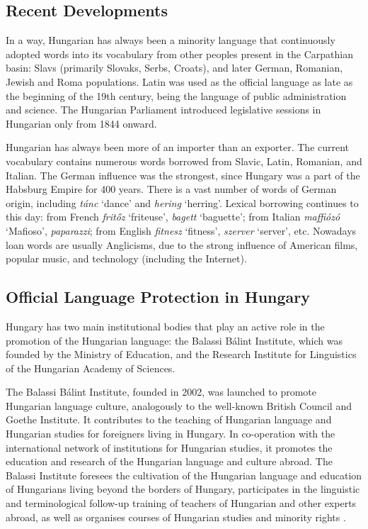 \begin{multicols}{2}
  \subsection{Recent Developments}

  In a way, Hungarian has always been a minority language that continuously adopted words into its vocabulary from other peoples present in the Carpathian basin: Slavs (primarily Slovaks, Serbs, Croats), and later German, Romanian, Jewish and Roma populations. Latin was used as the official language as late as the beginning of the 19th century, being the language of public administration and science. The Hungarian Parliament introduced legislative sessions in Hungarian only from 1844 onward.

  Hungarian has always been more of an importer than an exporter. The current vocabulary contains numerous words borrowed from Slavic, Latin, Romanian, and Italian. The German influence was the strongest, since Hungary was a part of the Habsburg Empire for 400 years. There is a vast number of words of German origin, including \textit{tánc} `dance' and \textit{hering} `herring'. Lexical borrowing continues to this day: from French \textit{fritőz} `friteuse', \textit{bagett} `baguette'; from Italian \textit{maffiózó} `Mafioso', \textit{paparazzi}; from English \textit{fitnesz} `fitness', \textit{szerver} `server', etc. Nowadays loan words are usually Anglicisms, due to the strong influence of American films, popular music, and technology (including the Internet). 

  \subsection{Official Language Protection in Hungary}

  Hungary has two main institutional bodies that play an active role in the promotion of the Hungarian language: the Balassi Bálint Institute, which was founded by the Ministry of Education, and  the Research Institute for Linguistics of the Hungarian Academy of Sciences. 


  The Balassi Bálint Institute, founded in 2002, was launched to promote Hungarian language culture, analogously to the well-known British Council and Goethe Institute. It contributes to the teaching of Hungarian language and Hungarian studies for foreigners living in Hungary. In co-operation with the international network of institutions for Hungarian studies, it promotes the education and research of the Hungarian language and culture abroad.  The Balassi Institute foresees the cultivation of the Hungarian language and education of Hungarians living beyond the borders of Hungary, participates in the linguistic and terminological follow-up training of teachers of Hungarian and other experts abroad, as well as organises courses of Hungarian studies and minority rights \cite{bbi}. 


\end{multicols}

